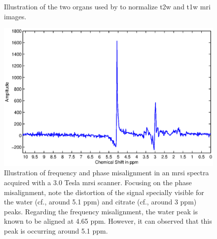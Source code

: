 \begin{figure}
  \centering
  \hspace*{\fill}
   \hfill
  \hspace*{\fill}
  \caption{Illustration of the two organs used by \cite{Niaf2011,Niaf2012} to normalize \ac{t2w} and \ac{t1w} \ac{mri} images.}
  \label{fig:niaf}
\end{figure}

\begin{figure}
  \centering
  \includegraphics[width=0.6\linewidth]{12_figures/figures/phase/phase.eps}
  \caption{Illustration of frequency and phase misalignment in an \ac{mrsi} spectra acquired with a 3.0 Tesla \ac{mrsi} scanner. Focusing on the phase misalignment, note the distortion of the signal specially visible for the water (cf., around 5.1 ppm) and citrate (cf., around 3 ppm) peaks. Regarding the frequency misalignment, the water peak is known to be aligned at 4.65 ppm. However, it can observed that this peak is occurring around 5.1 ppm.}
  \label{fig:phase}
\end{figure}

